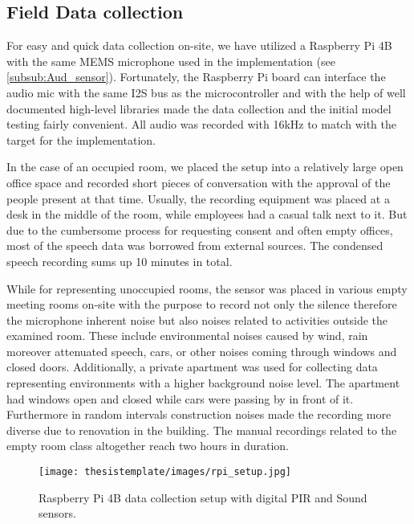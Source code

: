 \subsection{Field Data collection}

For easy and quick data collection on-site, we have utilized a Raspberry Pi 4B with the same MEMS microphone used in the implementation (see  \autoref{subsub:Aud_sensor}). Fortunately, the Raspberry Pi board can interface the audio mic with the same I2S bus as the microcontroller and with the help of well documented high-level libraries made the data collection and the initial model testing fairly convenient. All audio was recorded with 16kHz to match with the target for the implementation. 

In the case of an occupied room, we placed the setup into a relatively large open office space and recorded short pieces of conversation with the approval of the people present at that time. Usually, the recording equipment was placed at a desk in the middle of the room, while employees had a casual talk next to it. But due to the cumbersome process for requesting consent and often empty offices, most of the speech data was borrowed from external sources. The condensed speech recording sums up 10 minutes in total.

While for representing unoccupied rooms, the sensor was placed in various empty meeting rooms on-site with the purpose to record not only the silence therefore the microphone inherent noise but also noises related to activities outside the examined room. These include environmental noises caused by wind, rain moreover attenuated speech, cars, or other noises coming through windows and closed doors. Additionally, a private apartment was used for collecting data representing environments with a higher background noise level. The apartment had windows open and closed while cars were passing by in front of it. Furthermore in random intervals construction noises made the recording more diverse due to renovation in the building. The manual recordings related to the empty room class altogether reach two hours in duration.


\begin{figure}[ht]
  \begin{center}
    \texttt{[image: thesistemplate/images/rpi\_setup.jpg]}
    \caption{Raspberry Pi 4B data collection setup with digital PIR and Sound sensors.}
    \label{fig:rpi_coll}
  \end{center}
\end{figure}


